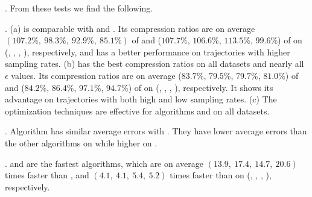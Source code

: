 .
From these tests we find the following.

\emph{}. (a) \operb is comparable {with \fbqsa and \dpa}. Its compression ratios are on average $(107.2\%, ~98.3\%, ~92.9\%, ~85.1\%)$ of \fbqsa and ($107.7\%$, $106.6\%$, $113.5\%$, $99.6\%$) of \dpa on (\taxi, \truck, \ucar, \geolife), respectively, and \operb has a better performance on trajectories with higher sampling rates.
(b) \operba has the best compression ratios on all datasets and nearly all $\epsilon$ values.
Its compression ratios are on average {($83.7\%$, $79.5\%$, $79.7\%$, $81.0\%$)} of \fbqsa and {($84.2\%$, $86.4\%$, $97.1\%$, $94.7\%$)} of \dpa on (\taxi, \truck, \ucar, \geolife), respectively.
It shows its advantage on trajectories with both high and low sampling rates.
(c) The optimization techniques are effective for algorithms \operb and \operba on all datasets.

\emph{}. {Algorithm \operb has similar average errors with \operba. They have lower average errors than the other algorithms on \taxi while higher on \ucar.}


\emph{}. \operb and \operba are the fastest algorithms, which are on average $(13.9, ~17.4, ~14.7, {~20.6})$ times faster than \dpa, and $(4.1,~4.1,~5.4, {~5.2})$
times faster than \fbqsa on (\taxi, \truck, \ucar, \geolife), respectively.




